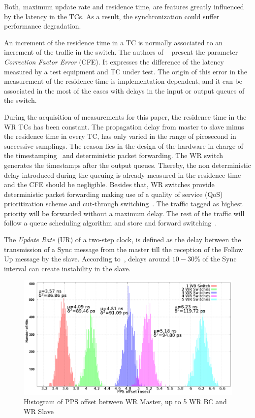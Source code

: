 Both, maximum update rate and residence time, are features greatly influenced
by the latency in the TCs. As a result, the synchronization could suffer
performance degradation. 

An increment of the residence time in a TC is normally associated 
to an increment of the traffic in the switch. The authors of ~\cite{biblio:tc_perf} 
present the parameter \textit{Correction Factor Error} (CFE). It expresses the difference 
of the latency measured by a test equipment and TC under test. The origin of this error in 
the measurement of the residence time is implementation-dependent, and it can be associated 
in the most of the cases with delays in the input or output queues of the switch.

During the acquisition of measurements for this paper, the residence time in the
WR TCs has been constant. The propagation delay from master to slave 
minus the residence time in every TC, has only varied in the range of
picosecond in successive samplings. The reason lies in the design of the
hardware in charge of the timestamping~\cite{biblio:tomas} and
deterministic packet forwarding. The WR switch generates the timestamps after 
the output queues. Thereby, the non deterministic delay
introduced during the queuing is already measured in the residence time and the
CFE should be negligible. Besides that, WR switches provide deterministic packet forwarding making use of a 
quality of service (QoS) prioritization scheme and cut-through
switching~\cite{biblio:switch_book}. The traffic tagged as highest priority will be forwarded 
without a maximum delay. The rest of the traffic will follow a queue scheduling algorithm and
store and forward switching~\cite{biblio:switch_book}.

The \textit{Update Rate} (UR) of a two-step clock, is defined as the delay between the transmission of a Sync
message from the master till the reception of the Follow Up message by the slave. 
According to~\cite{biblio:tc_perf}, delays around $10-30\%$ of the Sync interval can create
instability in the slave. 

\FloatBarrier
\begin{figure}[!t]
\centering
\includegraphics[scale=0.29]{fig/bc.png}
\caption{Histogram of PPS offset between WR Master, up to 5 WR BC and WR Slave}
\label{fig:wr_bc}
\end{figure}

